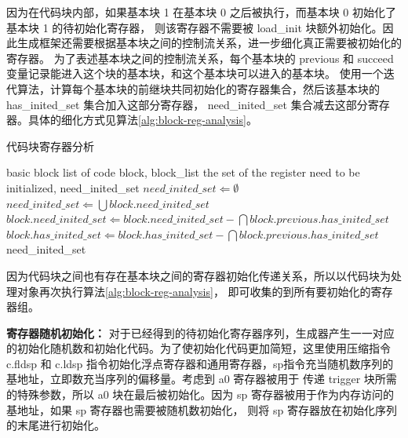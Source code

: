 因为在代码块内部，如果基本块 1 在基本块 0 之后被执行，而基本块 0 初始化了基本块 1 的待初始化寄存器，
则该寄存器不需要被 load\_init 块额外初始化。因此生成框架还需要根据基本块之间的控制流关系，进一步细化真正需要被初始化的寄存器。
为了表述基本块之间的控制流关系，每个基本块的 previous 和 succeed 变量记录能进入这个块的基本块，和这个基本块可以进入的基本块。
使用一个迭代算法，计算每个基本块的前继块共同初始化的寄存器集合，然后该基本块的 has\_inited\_set 集合加入这部分寄存器，
need\_inited\_set 集合减去这部分寄存器。具体的细化方式见算法\ref{alg:block-reg-analysis}。\par

\begin{algorithm}[!h]
    
    \caption{代码块寄存器分析}
    \label{alg:block-reg-analysis}
    \renewcommand{\algorithmicrequire}{\textbf{Input:}}
    \renewcommand{\algorithmicensure}{\textbf{Output:}}
    
    \begin{algorithmic}[1]
        \REQUIRE basic block list of code block, block\_list    %
        \ENSURE  the set of the register need to be initialized, need\_inited\_set  %
        \STATE $need\_inited\_set \Leftarrow \emptyset$
            \STATE $need\_inited\_set \Leftarrow \bigcup block.need\_inited\_set$
                \STATE $block.need\_inited\_set \Leftarrow block.need\_inited\_set - \bigcap block.previous.has\_inited\_set$
                \STATE $block.has\_inited\_set \Leftarrow block.has\_inited\_set - \bigcap block.previous.has\_inited\_set$
            \ENDFOR
        \ENDWHILE
        \RETURN need\_inited\_set
    \end{algorithmic}
\end{algorithm}

因为代码块之间也有存在基本块之间的寄存器初始化传递关系，所以以代码块为处理对象再次执行算法\ref{alg:block-reg-analysis}，
即可收集的到所有要初始化的寄存器组。\par

\textbf{寄存器随机初始化：}
对于已经得到的待初始化寄存器序列，生成器产生一一对应的初始化随机数和初始化代码。为了使初始化代码更加简短，这里使用压缩指令
c.fldsp 和 c.ldsp 指令初始化浮点寄存器和通用寄存器，sp指令充当随机数序列的基地址，立即数充当序列的偏移量。考虑到 a0 寄存器被用于
传递 trigger 块所需的特殊参数，所以 a0 块在最后被初始化。因为 sp 寄存器被用于作为内存访问的基地址，如果 sp 寄存器也需要被随机数初始化，
则将 sp 寄存器放在初始化序列的末尾进行初始化。\par

